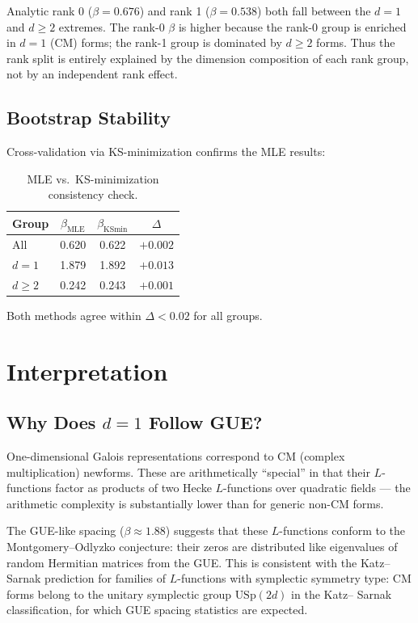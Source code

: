 \documentclass[11pt]{article}
\begin{document}
Analytic rank 0 ($\beta=0.676$) and rank 1 ($\beta=0.538$) both fall
between the $d=1$ and $d\ge2$ extremes.  The rank-0 $\beta$ is higher
because the rank-0 group is enriched in $d=1$ (CM) forms; the rank-1
group is dominated by $d\ge2$ forms.  Thus the rank split is entirely
explained by the dimension composition of each rank group, not by an
independent rank effect.

\subsection{Bootstrap Stability}

Cross-validation via KS-minimization confirms the MLE results:
\begin{table}[ht]
\centering
\caption{MLE vs.\ KS-minimization consistency check.}
\label{tab:consistency}
\begin{tabular}{lccc}
\toprule
Group & $\beta_\text{MLE}$ & $\beta_\text{KSmin}$ & $\Delta$ \\
\midrule
All   & 0.620 & 0.622 & $+0.002$ \\
$d=1$ & 1.879 & 1.892 & $+0.013$ \\
$d\ge2$ & 0.242 & 0.243 & $+0.001$ \\
\bottomrule
\end{tabular}
\end{table}
Both methods agree within $\Delta < 0.02$ for all groups.

\section{Interpretation}
\label{sec:interpretation}

\subsection{Why Does $d=1$ Follow GUE?}

One-dimensional Galois representations correspond to CM (complex
multiplication) newforms.  These are arithmetically ``special'' in
that their $L$-functions factor as products of two Hecke $L$-functions
over quadratic fields --- the arithmetic complexity is substantially
lower than for generic non-CM forms.

The GUE-like spacing ($\beta\approx1.88$) suggests that these
$L$-functions conform to the Montgomery--Odlyzko conjecture: their
zeros are distributed like eigenvalues of random Hermitian matrices
from the GUE.  This is consistent with the Katz--Sarnak prediction for
families of $L$-functions with symplectic symmetry type: CM forms
belong to the unitary symplectic group $\text{USp}(2d)$ in the Katz--
Sarnak classification, for which GUE spacing statistics are expected.
\end{document}

